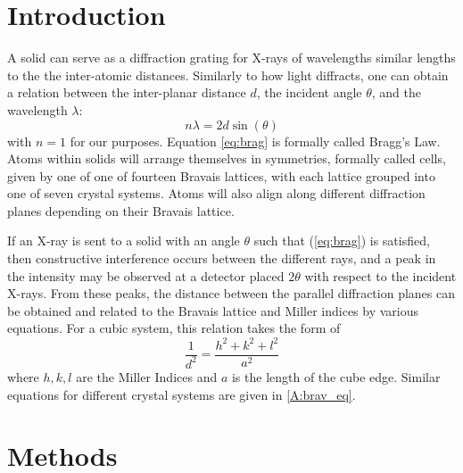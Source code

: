 \documentclass[12pt]{article}
\begin{document}
\thispagestyle{empty}
\pagebreak
\setcounter{page}{1}


\section{Introduction}\label{sec:int}

A solid can serve as a diffraction
grating for X-rays of wavelengths similar lengths to the the inter-atomic distances.
Similarly to how light diffracts, one can obtain a relation between the inter-planar
distance $d$, the incident angle $\theta$, and the wavelength $\lambda$: 
\begin{equation}\label{eq:brag}
	n\lambda=2d\sin(\theta)
\end{equation}
with $n=1$ for our purposes. Equation \ref{eq:brag} is formally called Bragg's Law. 
Atoms within solids will arrange themselves in symmetries, formally called cells, given
by one of one of fourteen Bravais lattices, with each lattice grouped into one of seven crystal 
systems. Atoms will also align along different diffraction planes depending on their Bravais lattice.

If an X-ray is sent to a solid with an angle $\theta$ such that (\ref{eq:brag}) is satisfied,
then constructive interference occurs between the different rays, and a peak in the intensity
may be observed at a detector placed $2\theta$ with respect to the incident X-rays. From these
peaks, the distance between the parallel diffraction planes can be obtained and related to the 
Bravais lattice and Miller indices by various equations. For a cubic system, this relation
takes the form of
%
\begin{equation}
	\frac{1}{d^2}=\frac{h^2+k^2+l^2}{a^2}
\end{equation}
%
where $h,k,l$ are the Miller Indices and $a$ is the length of the cube edge. Similar equations
for different crystal systems are given in \ref{A:brav_eq}. 



\section{Methods}\label{sec:met}
\end{document}
